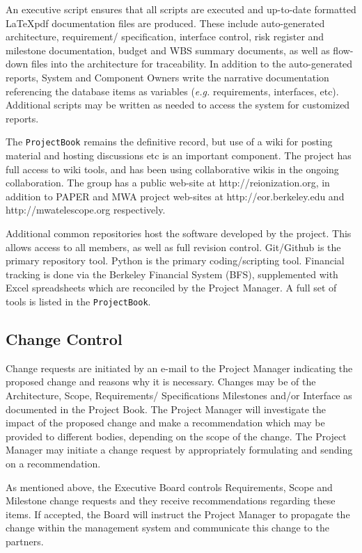 \documentclass[preprint]{aastex}
\begin{document}
An executive script ensures that all scripts are executed and up-to-date formatted
\LaTeX pdf documentation files are produced. These include auto-generated
architecture, requirement/ specification, interface control, risk register and
milestone documentation, budget and WBS summary documents, as well as flow-down files
into the architecture for traceability. In addition to the auto-generated reports,
System and Component Owners write the narrative documentation referencing the
database items as variables ({\em e.g.} requirements, interfaces, etc). Additional
scripts may be written as needed to access the system for customized reports.

The {\tt ProjectBook} remains the definitive record, but use of a wiki for posting material and hosting
discussions etc is an important component.  The project has full access to wiki tools, and has been
using collaborative wikis in the ongoing collaboration.  The group has a public web-site at http://reionization.org, 
in addition to PAPER and MWA project web-sites at http://eor.berkeley.edu and http://mwatelescope.org respectively.

Additional common repositories host the software developed by the project.  This allows access to all members,
as well as full revision control.  Git/Github is the primary repository tool.  Python is the primary coding/scripting
tool.  Financial tracking is done via the Berkeley Financial System (BFS), supplemented with Excel spreadsheets which are
reconciled by the Project Manager.  A full set of tools is listed in the {\tt ProjectBook}.

\subsection{Change Control}
\label{sec:changecontrol}
Change requests are initiated by an e-mail to the Project Manager indicating the proposed change
and reasons why it is necessary.  Changes may be of the Architecture, Scope, Requirements/ Specifications
Milestones and/or Interface as documented in the Project Book.  The Project Manager will investigate the 
impact of the proposed change and make a recommendation which may be provided to different bodies, 
depending on the scope of the change.  The Project Manager may initiate a change request by appropriately 
formulating and sending on a recommendation.

As mentioned above, the Executive Board controls Requirements, Scope and Milestone change requests
and they receive recommendations regarding these items.  If accepted, the Board will instruct the Project Manager to 
propagate the change within the management system and communicate this change to the partners.
\end{document}
